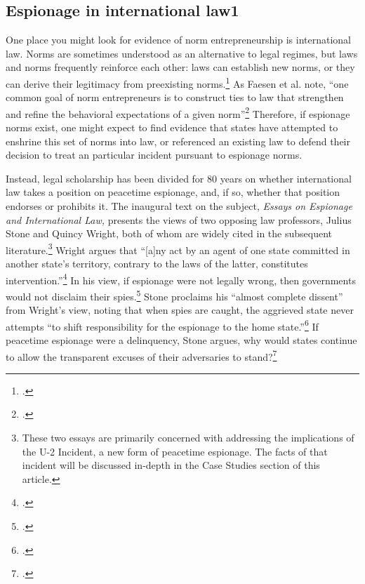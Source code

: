 \documentclass[12pt]{extarticle}
\begin{document}
\subsection{Espionage in international law1}

One place you might look for evidence of norm entrepreneurship is international law. Norms are sometimes understood as an alternative to legal regimes, but laws and norms frequently reinforce each other: laws can establish new norms, or they can derive their legitimacy from preexisting norms.\footcite[441]{finnemore_constructing_2016} As Faesen et al. note, \enquote{one common goal of norm entrepreneurs is to construct ties to law that strengthen and refine the behavioral expectations of a given norm}\footcite[25]{faesen_blurred_2020} Therefore, if espionage norms exist, one might expect to find evidence that states have attempted to enshrine this set of norms into law, or referenced an existing law to defend their decision to treat an particular incident pursuant to espionage norms.

Instead, legal scholarship has been divided for 80 years on whether international law takes a position on peacetime espionage, and, if so, whether that position endorses or prohibits it. The inaugural text on the subject, \emph{Essays on Espionage and International Law,} presents the views of two opposing law professors, Julius Stone and Quincy Wright, both of whom are widely cited in the subsequent literature.\footnote{These two essays are primarily concerned with addressing the implications of the U-2 Incident, a new form of peacetime espionage. The facts of that incident will be discussed in-depth in the Case Studies section of this article.} Wright argues that \enquote{[a]ny act by an agent of one state committed in another state’s territory, contrary to the laws of the latter, constitutes intervention.}\footcite[13]{wright_espionage_1962} In his view, if espionage were not legally wrong, then governments would not disclaim their spies.\footcite[17]{wright_espionage_1962} Stone proclaims his \enquote{almost complete dissent} from Wright's view, noting that when spies are caught, the aggrieved state never attempts \enquote{to shift responsibility for the espionage to the home state.}\footcite[33]{stone_legal_1962} If peacetime espionage were a delinquency, Stone argues, why would states continue to allow the transparent excuses of their adversaries to stand?\footcite[39]{stone_legal_1962}
\end{document}
